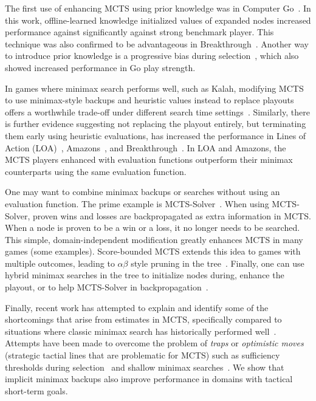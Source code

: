 \documentclass[letterpaper]{article}
\begin{document}
The first use of enhancing MCTS using prior knowledge was in Computer Go~\cite{Gelly07Combining}. 
In this work, offline-learned knowledge initialized values of expanded nodes increased performance against significantly against 
strong benchmark player. This technique was also confirmed to be advantageous in Breakthrough~\cite{Lorentz13Breakthrough}. 
Another way to introduce prior knowledge is a progressive bias during selection~\cite{Chaslot08Progressive}, which also showed 
increased performance in Go play strength. 

In games where minimax search performs well, such as Kalah, 
modifying MCTS to use minimax-style backups and heuristic values instead to replace playouts offers a worthwhile trade-off 
under different search time settings~\cite{Ramanujan11Tradeoffs}.
Similarly, there is further evidence suggesting not replacing the playout entirely, but terminating them early 
using heuristic evaluations, has increased the performance in Lines of Action (LOA)~\cite{Winands10MCTS-LOA}, 
Amazons~\cite{Kloetzer10Amazons,Lorentz08Amazons}, and Breakthrough~\cite{Lorentz13Breakthrough}. In LOA and Amazons, the 
MCTS players enhanced with evaluation functions outperform their minimax counterparts using the same evaluation function.


One may want to combine minimax backups or searches without using an evaluation function. 
The prime example is MCTS-Solver~\cite{Winands08Solver}. When using 
MCTS-Solver, proven wins and losses are backpropagated as extra information in MCTS. When a node is proven to be a 
win or a loss, it no longer needs to be searched. This simple, domain-independent modification greatly enhances 
MCTS in many games (some examples). Score-bounded MCTS extends this idea to games with multiple outcomes, 
leading to $\alpha \beta$ style pruning in the tree~\cite{Cazenave10ScoreBounded}. Finally, one can use hybrid
minimax searches in the tree to initialize nodes during, enhance the playout, or to help MCTS-Solver 
in backpropagation~\cite{Baier13MinimaxHybrids}.

Finally, recent work has attempted to explain and identify some of the shortcomings that arise from estimates in 
MCTS, specifically compared to situations where classic minimax search has historically performed 
well~\cite{Ramanujan10Understanding,Ramanujan10On}. 
Attempts have been made to overcome the problem of {\it traps} or {\it optimistic moves} (strategic  
tactial lines that are problematic for MCTS) such as sufficiency thresholds during selection~\cite{Gudmindsson13Sufficiency} 
and shallow minimax searches~\cite{Baier13MinimaxHybrids}. We show that implicit minimax backups also
improve performance in domains with tactical short-term goals. 
\end{document}
